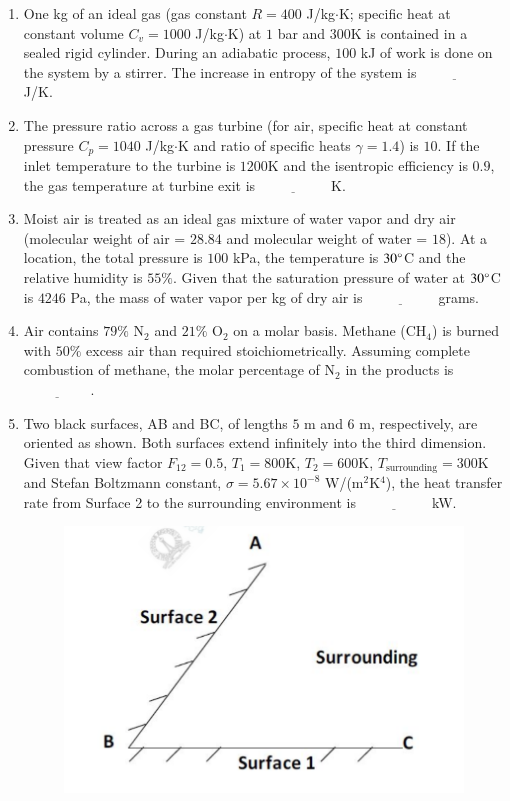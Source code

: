 \documentclass[journal]{IEEEtran}
\begin{document}
\begin{enumerate}[leftmargin=0pt]
    \item One kg of an ideal gas (gas constant $R = 400$ J/kg$\cdot$K; specific heat at constant volume $C_v = 1000$ J/kg$\cdot$K) at $1$ bar and $300$K is contained in a sealed rigid cylinder. During an adiabatic process, $100$ kJ of work is done on the system by a stirrer. The increase in entropy of the system is $\underline{\hspace{2cm}}$ J/K.

    \item The pressure ratio across a gas turbine (for air, specific heat at constant pressure $C_p = 1040$ J/kg$\cdot$K and ratio of specific heats $\gamma = 1.4$) is $10$. If the inlet temperature to the turbine is $1200$K and the isentropic efficiency is $0.9$, the gas temperature at turbine exit is $\underline{\hspace{2cm}}$ K.

    \item Moist air is treated as an ideal gas mixture of water vapor and dry air (molecular weight of air = $28.84$ and molecular weight of water = $18$). At a location, the total pressure is $100$ kPa, the temperature is $30\degree$C and the relative humidity is $55\%$. Given that the saturation pressure of water at $30\degree$C is $4246$ Pa, the mass of water vapor per kg of dry air is $\underline{\hspace{2cm}}$ grams.

    \item Air contains $79\%$ N$_2$ and $21\%$ O$_2$ on a molar basis. Methane (CH$_4$) is burned with $50\%$ excess air than required stoichiometrically. Assuming complete combustion of methane, the molar percentage of N$_2$ in the products is $\underline{\hspace{2cm}}$.

    \item Two black surfaces, AB and BC, of lengths $5$ m and $6$ m, respectively, are oriented as shown. Both surfaces extend infinitely into the third dimension. Given that view factor $F_{12} = 0.5$, $T_1 = 800$K, $T_2 = 600$K, $T_{\text{surrounding}} = 300$K and Stefan Boltzmann constant, $\sigma = 5.67 \times 10^{-8}$ W/(m$^2$K$^4$), the heat transfer rate from Surface 2 to the surrounding environment is $\underline{\hspace{2cm}}$ kW.
    \begin{figure}[h]
\centering
\includegraphics[width=0.5\columnwidth]{Figs/image (24).png}
\caption*{}
\label{fig:37}
\end{figure}


\end{enumerate}
\end{document}
